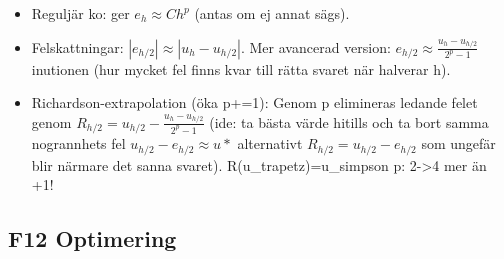 \documentclass[a4paper]{article}
\begin{document}
\begin{itemize}
    \begin{itemize}
        \item Reguljär ko: ger $e_h\approx Ch^p$ (antas om ej annat sägs).
        \item Felskattningar: $|e_{h/2}|\approx |u_h-u_{h/2}|$. Mer avancerad version: $e_{h/2}\approx \frac{u_h-u_{h/2}}{2^p-1}$ inutionen (hur mycket fel finns kvar till rätta svaret när halverar h).
        \item Richardson-extrapolation (öka p+=1): Genom p elimineras ledande felet genom $R_{h/2}=u_{h/2}-\frac{u_h-u_{h/2}}{2^p-1}$ (ide: ta bästa värde hitills och ta bort samma nogrannhets fel $u_{h/2}-e_{h/2}\approx u*$ alternativt $R_{h/2}=u_{h/2}-e_{h/2}$ som ungefär blir närmare det sanna svaret). R(u_trapetz)=u_simpson p: 2->4 mer än +1!
    \end{itemize}
\end{itemize}

\subsection{F12 Optimering}
\end{document}

